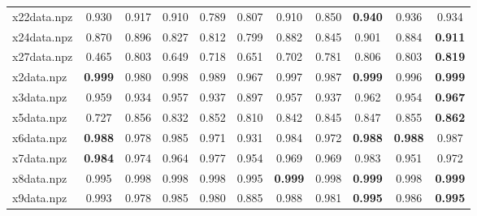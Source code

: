 \documentclass{article}
\begin{document}
\begin{table}[htbp]
\begin{adjustbox}{width=\textwidth}
\begin{tabular}{lcccccccccc}
x22data.npz & 0.930 & 0.917 & 0.910 & 0.789 & 0.807 & 0.910 & 0.850 & \cellcolor{graybg}\textbf{0.940} & 0.936 & 0.934 \\
x24data.npz & 0.870 & 0.896 & 0.827 & 0.812 & 0.799 & 0.882 & 0.845 & 0.901 & 0.884 & \cellcolor{graybg}\textbf{0.911} \\
x27data.npz & 0.465 & 0.803 & 0.649 & 0.718 & 0.651 & 0.702 & 0.781 & 0.806 & 0.803 & \cellcolor{graybg}\textbf{0.819} \\
x2data.npz & \cellcolor{graybg}\textbf{0.999} & 0.980 & 0.998 & 0.989 & 0.967 & 0.997 & 0.987 & \cellcolor{graybg}\textbf{0.999} & 0.996 & \cellcolor{graybg}\textbf{0.999} \\
x3data.npz & 0.959 & 0.934 & 0.957 & 0.937 & 0.897 & 0.957 & 0.937 & 0.962 & 0.954 & \cellcolor{graybg}\textbf{0.967} \\
x5data.npz & 0.727 & 0.856 & 0.832 & 0.852 & 0.810 & 0.842 & 0.845 & 0.847 & 0.855 & \cellcolor{graybg}\textbf{0.862} \\
x6data.npz & \cellcolor{graybg}\textbf{0.988} & 0.978 & 0.985 & 0.971 & 0.931 & 0.984 & 0.972 & \cellcolor{graybg}\textbf{0.988} & \cellcolor{graybg}\textbf{0.988} & 0.987 \\
x7data.npz & \cellcolor{graybg}\textbf{0.984} & 0.974 & 0.964 & 0.977 & 0.954 & 0.969 & 0.969 & 0.983 & 0.951 & 0.972 \\
x8data.npz & 0.995 & 0.998 & 0.998 & 0.998 & 0.995 & \cellcolor{graybg}\textbf{0.999} & 0.998 & \cellcolor{graybg}\textbf{0.999} & 0.998 & \cellcolor{graybg}\textbf{0.999} \\
x9data.npz & 0.993 & 0.978 & 0.985 & 0.980 & 0.885 & 0.988 & 0.981 & \cellcolor{graybg}\textbf{0.995} & 0.986 & \cellcolor{graybg}\textbf{0.995} \\
\hline
\end{tabular}
\end{adjustbox}
\end{table}
\end{document}
